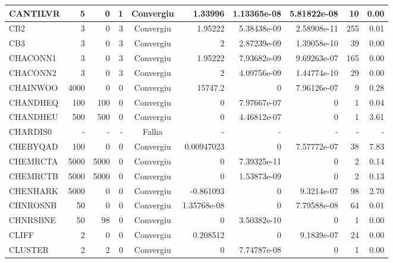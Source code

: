 \begin{center}
\begin{longtable}{|l|r|r|r|c|r|r|r|r|r|}
CANTILVR &      5 &      0 &      1 & Convergiu  &     1.33996 &    1.13365e-08 & 5.81822e-08 &     10 &    0.00 \\ \hline
     CB2 &      3 &      0 &      3 & Convergiu  &     1.95222 &    5.38438e-09 & 2.58908e-11 &    255 &    0.01 \\ \hline
     CB3 &      3 &      0 &      3 & Convergiu  &           2 &    2.87239e-09 & 1.39058e-10 &     39 &    0.00 \\ \hline
CHACONN1 &      3 &      0 &      3 & Convergiu  &     1.95222 &    7.93682e-09 & 9.69263e-07 &    165 &    0.00 \\ \hline
CHACONN2 &      3 &      0 &      3 & Convergiu  &           2 &    4.09756e-09 & 1.44774e-10 &     29 &    0.00 \\ \hline
CHAINWOO &   4000 &      0 &      0 & Convergiu  &     15747.2 &              0 & 7.96126e-07 &      9 &    0.28 \\ \hline
CHANDHEQ &    100 &    100 &      0 & Convergiu  &           0 &    7.97667e-07 &           0 &      1 &    0.04 \\ \hline
CHANDHEU &    500 &    500 &      0 & Convergiu  &           0 &    4.46812e-07 &           0 &      1 &    3.61 \\ \hline
CHARDIS0 & - & - & - & Falha & - & - & - & - & - \\ \hline
CHEBYQAD &    100 &      0 &      0 & Convergiu  &  0.00947023 &              0 & 7.57772e-07 &     38 &    7.83 \\ \hline
CHEMRCTA &   5000 &   5000 &      0 & Convergiu  &           0 &    7.39325e-11 &           0 &      2 &    0.14 \\ \hline
CHEMRCTB &   5000 &   5000 &      0 & Convergiu  &           0 &    1.53873e-09 &           0 &      2 &    0.13 \\ \hline
CHENHARK &   5000 &      0 &      0 & Convergiu  &   -0.861093 &              0 &  9.3214e-07 &     98 &    2.70 \\ \hline
CHNROSNB &     50 &      0 &      0 & Convergiu  & 1.35768e-08 &              0 & 7.79588e-08 &     64 &    0.01 \\ \hline
CHNRSBNE &     50 &     98 &      0 & Convergiu  &           0 &    3.50382e-10 &           0 &      1 &    0.00 \\ \hline
   CLIFF &      2 &      0 &      0 & Convergiu  &    0.208512 &              0 &  9.1839e-07 &     24 &    0.00 \\ \hline
 CLUSTER &      2 &      2 &      0 & Convergiu  &           0 &    7.74787e-08 &           0 &      1 &    0.00 \\ \hline

\end{longtable}
\end{center}
